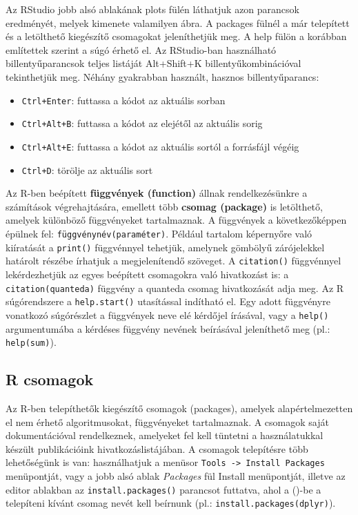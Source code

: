 \documentclass[
]{book}
\providecommand{\tightlist}{%
  \setlength{\itemsep}{0pt}\setlength{\parskip}{0pt}}
\begin{document}
Az RStudio jobb alsó ablakának plots fülén láthatjuk azon parancsok
eredményét, melyek kimenete valamilyen ábra. A packages fülnél a már
telepített és a letölthető kiegészítő csomagokat jeleníthetjük meg. A
help fülön a korábban említettek szerint a súgó érhető el. Az
RStudio-ban használható billentyűparancsok teljes listáját Alt+Shift+K
billentyűkombinációval tekinthetjük meg. Néhány gyakrabban használt,
hasznos billentyűparancs:

\begin{itemize}
\tightlist
\item
  \texttt{Ctrl+Enter}: futtassa a kódot az aktuális sorban
\item
  \texttt{Ctrl+Alt+B}: futtassa a kódot az elejétől az aktuális sorig
\item
  \texttt{Ctrl+Alt+E}: futtassa a kódot az aktuális sortól a forrásfájl
  végéig
\item
  \texttt{Ctrl+D}: törölje az aktuális sort
\end{itemize}

Az R-ben beépített \textbf{függvények (function)} állnak
rendelkezésünkre a számítások végrehajtására, emellett több
\textbf{csomag (package)} is letölthető, amelyek különböző függvényeket
tartalmaznak. A függvények a következőképpen épülnek fel:
\texttt{függvénynév(paraméter)}. Például tartalom képernyőre való
kiíratását a \texttt{print()} függvénnyel tehetjük, amelynek gömbölyű
zárójelekkel határolt részébe írhatjuk a megjelenítendő szöveget. A
\texttt{citation()} függvénnyel lekérdezhetjük az egyes beépített
csomagokra való hivatkozást is: a \texttt{citation(quanteda)} függvény a
quanteda csomag hivatkozását adja meg. Az R súgórendszere a
\texttt{help.start()} utasítással indítható el. Egy adott függvényre
vonatkozó súgórészlet a függvények neve elé kérdőjel írásával, vagy a
\texttt{help()} argumentumába a kérdéses függvény nevének beírásával
jeleníthető meg (pl.: \texttt{help(sum)}).

\hypertarget{packages}{%
\subsection{R csomagok}\label{packages}}

Az R-ben telepíthetők kiegészítő csomagok (packages), amelyek
alapértelmezetten el nem érhető algoritmusokat, függvényeket
tartalmaznak. A csomagok saját dokumentációval rendelkeznek, amelyeket
fel kell tüntetni a használatukkal készült publikációink
hivatkozáslistájában. A csomagok telepítésre több lehetőségünk is van:
használhatjuk a menüsor
\texttt{Tools\ -\textgreater{}\ Install\ Packages} menüpontját, vagy a
jobb alsó ablak \emph{Packages} fül Install menüpontját, illetve az
editor ablakban az \texttt{install.packages()} parancsot futtatva, ahol
a ()-be a telepíteni kívánt csomag nevét kell beírnunk (pl.:
\texttt{install.packages(dplyr)}).
\end{document}
